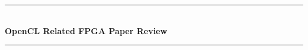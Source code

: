 \documentclass[12pt]{article} %
\begin{document}

\begin{titlepage}

\newcommand{\HRule}{\rule{\linewidth}{0.5mm}} %

\center %

\HRule \\[0.4cm]
{ \huge \bfseries OpenCL Related FPGA Paper Review}\\[0.4cm] %
\HRule \\[1.5cm]

\begin{minipage}{0.4\textwidth}
     \\ 
    \vspace{2em}
    \centering {\large \today}
\end{minipage}

\end{titlepage}




\end{document}

